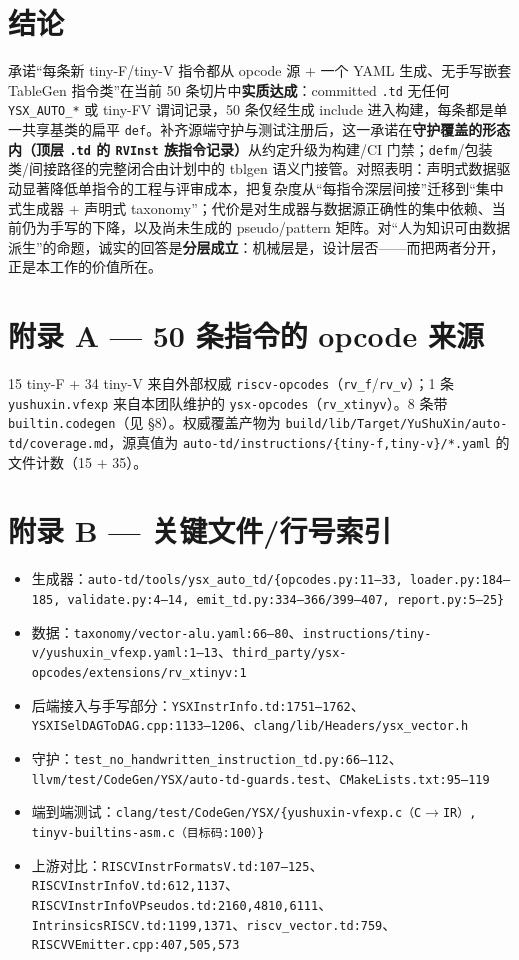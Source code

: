 \documentclass[11pt,UTF8,fontset=none]{ctexart}
\begin{document}
\section{结论}
承诺“每条新 tiny-F/tiny-V 指令都从 opcode 源 + 一个 YAML 生成、无手写嵌套 TableGen 指令类”在当前 50 条切片中\textbf{实质达成}：committed \texttt{.td} 无任何 \texttt{YSX\_AUTO\_*} 或 tiny-FV 谓词记录，50 条仅经生成 include 进入构建，每条都是单一共享基类的扁平 \texttt{def}。补齐源端守护与测试注册后，这一承诺在\textbf{守护覆盖的形态内（顶层 \texttt{.td} 的 \texttt{RVInst} 族指令记录）}从约定升级为构建/CI 门禁；\texttt{defm}/包装类/间接路径的完整闭合由计划中的 tblgen 语义门接管。对照表明：声明式数据驱动显著降低单指令的工程与评审成本，把复杂度从“每指令深层间接”迁移到“集中式生成器 + 声明式 taxonomy”；代价是对生成器与数据源正确性的集中依赖、当前仍为手写的下降，以及尚未生成的 pseudo/pattern 矩阵。对“人为知识可由数据派生”的命题，诚实的回答是\textbf{分层成立}：机械层是，设计层否——而把两者分开，正是本工作的价值所在。

\section*{附录 A — 50 条指令的 opcode 来源}
15 tiny-F + 34 tiny-V 来自外部权威 \texttt{riscv-opcodes}（\texttt{rv\_f}/\texttt{rv\_v}）；1 条 \texttt{yushuxin.vfexp} 来自本团队维护的 \texttt{ysx-opcodes}（\texttt{rv\_xtinyv}）。8 条带 \texttt{builtin.codegen}（见 §8）。权威覆盖产物为 \texttt{build/lib/Target/YuShuXin/auto-td/coverage.md}，源真值为 \texttt{auto-td/instructions/\{tiny-f,tiny-v\}/*.yaml} 的文件计数（15 + 35）。

\section*{附录 B — 关键文件/行号索引}
\begin{itemize}[leftmargin=1.4em,itemsep=1pt]
\item 生成器：\texttt{auto-td/tools/ysx\_auto\_td/\{opcodes.py:11--33, loader.py:184--185, validate.py:4--14, emit\_td.py:334--366/399--407, report.py:5--25\}}
\item 数据：\texttt{taxonomy/vector-alu.yaml:66--80}、\texttt{instructions/tiny-v/yushuxin\_vfexp.yaml:1--13}、\texttt{third\_party/ysx-opcodes/extensions/rv\_xtinyv:1}
\item 后端接入与手写部分：\texttt{YSXInstrInfo.td:1751--1762}、\texttt{YSXISelDAGToDAG.cpp:1133--1206}、\texttt{clang/lib/Headers/ysx\_vector.h}
\item 守护：\texttt{test\_no\_handwritten\_instruction\_td.py:66--112}、\texttt{llvm/test/CodeGen/YSX/auto-td-guards.test}、\texttt{CMakeLists.txt:95--119}
\item 端到端测试：\texttt{clang/test/CodeGen/YSX/\{yushuxin-vfexp.c（C$\to$IR）, tinyv-builtins-asm.c（目标码:100）\}}
\item 上游对比：\texttt{RISCVInstrFormatsV.td:107--125}、\texttt{RISCVInstrInfoV.td:612,1137}、\texttt{RISCVInstrInfoVPseudos.td:2160,4810,6111}、\texttt{IntrinsicsRISCV.td:1199,1371}、\texttt{riscv\_vector.td:759}、\texttt{RISCVVEmitter.cpp:407,505,573}
\end{itemize}
\end{document}
